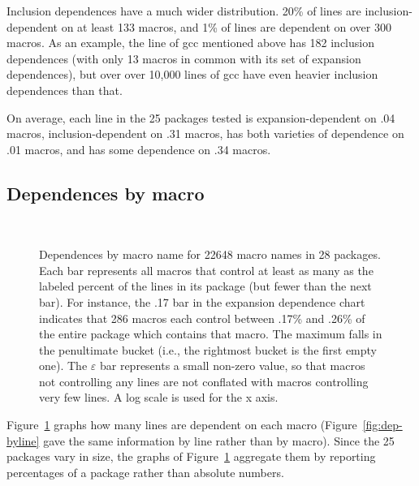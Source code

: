 \documentclass[10pt]{article}
\def\numdependpackages{25}
\newcommand{\pkg}[1]{\textsf{#1}}
\newcommand{\captionsmall}[1]{\caption[]{\small #1}}
\begin{document}
Inclusion dependences have a much wider distribution.  20\% of lines
are inclusion-dependent on at least 133 macros, and 1\% of lines are
dependent on over 300 macros.  As an example, the line of \pkg{gcc}
mentioned above has 182 inclusion dependences (with only 13 macros in
common with its set of expansion dependences), but over over 10,000 lines
of \pkg{gcc} have even heavier inclusion dependences than that.

On average, each line in the {\numdependpackages} packages tested is 
expansion-dependent on .04 macros, inclusion-dependent on .31 macros, has
both varieties of dependence on .01 macros, and has some dependence on .34
macros.
      

\subsection{Dependences by macro}

\begin{figure}
\centerline{%
\ %
}
\captionsmall{Dependences by macro name for 22648 macro names in 28 packages.
  Each bar represents all macros that control at least as many as the
  labeled percent of the lines in its package (but fewer than the next
  bar).  For instance, the .17 bar in the expansion dependence chart
  indicates that 286 macros each control between .17\% and .26\% of the
  entire package which contains that macro.  The maximum falls in the
  penultimate bucket (i.e., the rightmost bucket is the first empty one).
  The $\varepsilon$ bar represents a small non-zero value, so that macros
  not controlling any lines are not conflated with macros controlling very
  few lines.  A log scale is used for the x axis.}

\label{fig:dep-bymacro}
\end{figure}

Figure~\ref{fig:dep-bymacro} graphs how many lines are dependent on each
macro (Figure~\ref{fig:dep-byline} gave the same information by line rather
than by macro).  Since the {\numdependpackages} packages vary in size, the
graphs of Figure~\ref{fig:dep-bymacro} aggregate them by reporting
percentages of a package rather than absolute numbers.
\end{document}
